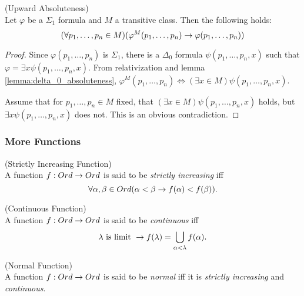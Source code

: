 \begin{lemma}{(Upward Absoluteness)}\label{lemma:upward_absoluteness}\\
Let $\varphi$ be a $\Sigma_1$ formula and $M$ a transitive class. Then the following holds:
\begin{equation}
(\forall p_1, \ldots, p_n \in M)(\varphi^M(p_1, \ldots, p_n) \rightarrow \varphi(p_1, \ldots, p_n))
\end{equation}
\end{lemma}
\begin{proof}
Since $\varphi(p_1, \ldots, p_n)$ is $\Sigma_1$, there is a $\Delta_0$ formula $\psi(p_1, \ldots, p_n, x)$ such that $\varphi = \exists x \psi(p_1, \ldots, p_n, x)$. From relativization and lemma \ref{lemma:delta_0_absoluteness}, $\varphi^M(p_1, \ldots, p_n) \iff (\exists x \in M)\psi(p_1, \ldots, p_n, x)$.

Assume that for $p_1, \ldots, p_n \in M$ fixed, that $(\exists x \in M)\psi(p_1, \ldots, p_n, x)$ holds, but $\exists x \psi(p_1, \ldots, p_n, x)$ does not. This is an obvious contradiction.
\end{proof}


\subsubsection{More Functions}

\begin{definition}{(Strictly Increasing Function)}\label{def:increasing_function}\\
A function $f: Ord \rightarrow Ord$ is said to be \emph{strictly increasing} iff
\begin{equation}
\forall \alpha, \beta \in Ord (\alpha < \beta \rightarrow f(\alpha) < f(\beta)).
\end{equation}
\end{definition}

\begin{definition}{(Continuous Function)}\label{def:continuous_function}\\
A function $f: Ord \rightarrow Ord$ is said to be \emph{continuous} iff
\begin{equation}
\lambda\mbox{ is limit } \rightarrow f(\lambda) = \bigcup_{\alpha < \lambda} f(\alpha).
\end{equation}
\end{definition}

\begin{definition}{(Normal Function)}\label{def:normal_function}\\
A function $f: Ord \rightarrow Ord$ is said to be \emph{normal} iff it is \emph{strictly increasing} and \emph{continuous}.
\end{definition}

